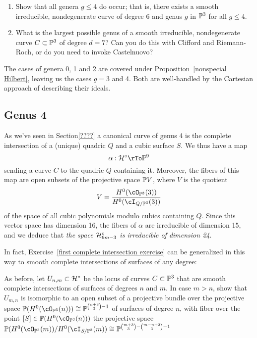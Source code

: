 \begin{exercise}
\begin{enumerate}
\item Show that all genera $g \leq 4$ do occur; that is, there exists a smooth irreducible, nondegenerate curve of degree 6 and genus $g$ in $\PP^3$ for all $g \leq 4$.
\item What is the largest possible genus of a smooth irreducible, nondegenerate curve $C \subset \PP^3$ of degree $d=7$? Can you do this with Clifford and Riemann-Roch, or do you need to invoke Castelnuovo?
\end{enumerate}
\end{exercise}

The cases of genera 0, 1 and 2 are covered under Proposition~\ref{nonspecial Hilbert}, leaving us the cases $g = 3$ and 4. Both are well-handled by the Cartesian approach of describing their ideals.

\subsection{Genus 4}

As we've seen in Section\ref{????} a canonical curve of genus 4 is the complete intersection of a (unique) quadric $Q$ and a cubic surface $S$. We thus have a map
$$
\alpha : \cH^\circ \rTo \PP^9
$$
sending a curve $C$ to the quadric $Q$ containing it. Moreover, the fibers of this map are open subsets of the projective space $\PP V$, where $V$ is the quotient
$$
V = \frac{H^0(\cO_{\PP^3}(3))}{H^0(\cI_{Q/\PP^3}(3))}
$$
of the space of all cubic polynomials modulo cubics containing $Q$. Since this vector space has dimension 16, the fibers of $\alpha$ are irreducible of dimension 15, and we deduce that \emph{the space $\cH^\circ_{6m-3}$ is irreducible of dimension 24}.

In fact, Exercise~\ref{first complete intersection exercise} can be generalized in this way to smooth complete intersections of surfaces of any degree:

\begin{exercise}\label{second complete intersection exercise}
As before, let $U_{n,m} \subset \cH^\circ$ be the locus of curves $C \subset \PP^3$ that are smooth complete intersections of surfaces of degrees $n$ and $m$.
 In case $m > n$, show that $U_{m,n}$ is isomorphic to an open subset of a projective bundle over the projective space $\PP(H^0(\cO_{\PP^3}(n))) \cong \PP^{\binom{n+3}{3}-1}$ of surfaces of degree $n$, with fiber over the point $[S] \in \PP(H^0(\cO_{\PP^3}(n)))$ the projective space $\PP(H^0(\cO_{\PP^3}(m))/H^0(\cI_{S/\PP^3}(m)) \cong \PP^{\binom{m+3}{3} - \binom{m-n+3}{3} - 1}$ 
\end{exercise}


